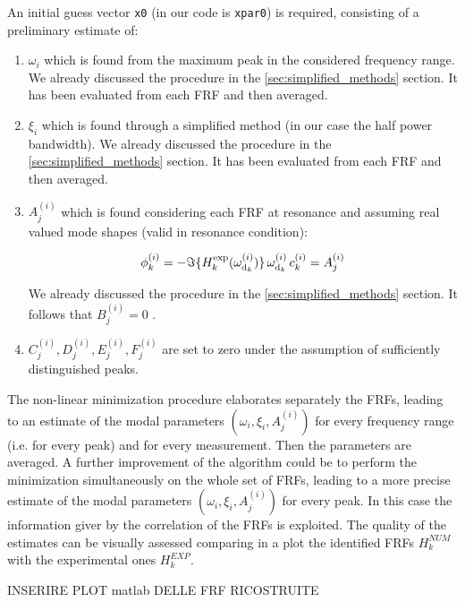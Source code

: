 \documentclass[a4paper,12pt,oneside]{article}
\begin{document}
An initial guess vector \texttt{x0} (in our code is \texttt{xpar0}) is required, consisting of a preliminary estimate of:
\begin{enumerate}
\item $\omega_i$ which is found from the maximum peak in the considered frequency range. We already discussed the procedure in the \ref{sec:simplified_methods} section. It has been evaluated from each FRF and then averaged.
\item $\xi_i$ which is found through a simplified method (in our case the half power bandwidth). We already discussed the procedure in the \ref{sec:simplified_methods} section. It has been evaluated from each FRF and then averaged.
\item  $A_{j}^{(i)}$ which is found considering each FRF at resonance and assuming real
valued mode shapes (valid in resonance condition):

\[
\phi^{(i)}_k = %
		- \Im\{H^{\textup{exp}}_k(\omega_{\textup{d}_k}^{(i)})\} %
		\, \omega_{\textup{d}_k}^{(i)} \, c^{(i)}_k
		= A_{j}^{(i)}
\]

We already discussed the procedure in the \ref{sec:simplified_methods} section.
It follows that $B_{j}^{(i)} = 0 $ .
\item $C_{j}^{(i)} , D_{j}^{(i)}, E_{j}^{(i)}, 	F_{j}^{(i)}$ are set to zero under the assumption of sufficiently distinguished peaks.
\end{enumerate}

The non-linear minimization procedure elaborates separately the FRFs, leading to an estimate of the modal parameters $(\omega_i, \xi_i, A_{j}^{(i)})$ for every frequency range (i.e. for every peak) and for every measurement. Then the parameters are averaged. 
A further improvement of the algorithm could be to perform the minimization simultaneously on the whole set of FRFs, leading to a more precise estimate of the modal parameters $(\omega_i, \xi_i, A_{j}^{(i)})$ for every peak. In this case the information giver by the correlation of the FRFs is exploited.
The quality of the estimates can be visually assessed comparing in a plot the
identified FRFs $H_k ^ {NUM}$ with the experimental ones $H_k ^ {EXP}$.

INSERIRE PLOT matlab DELLE FRF RICOSTRUITE
\end{document}

